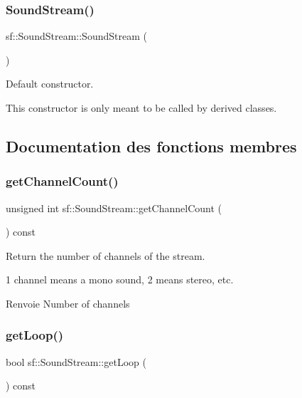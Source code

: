 \subsubsection{\texorpdfstring{Sound\+Stream()}{SoundStream()}}
{\footnotesize\ttfamily sf\+::\+Sound\+Stream\+::\+Sound\+Stream (\begin{DoxyParamCaption}{ }\end{DoxyParamCaption})\hspace{0.3cm}{\ttfamily [protected]}}



Default constructor. 

This constructor is only meant to be called by derived classes. 

\subsection{Documentation des fonctions membres}
\mbox{\label{classsf_1_1SoundStream_a1f70933912dd9498f4dc99feefed27f3}} 
\subsubsection{\texorpdfstring{get\+Channel\+Count()}{getChannelCount()}}
{\footnotesize\ttfamily unsigned int sf\+::\+Sound\+Stream\+::get\+Channel\+Count (\begin{DoxyParamCaption}{ }\end{DoxyParamCaption}) const}



Return the number of channels of the stream. 

1 channel means a mono sound, 2 means stereo, etc.

\begin{DoxyReturn}{Renvoie}
Number of channels 
\end{DoxyReturn}
\mbox{\label{classsf_1_1SoundStream_a49d263f9bbaefec4b019bd05fda59b25}} 
\subsubsection{\texorpdfstring{get\+Loop()}{getLoop()}}
{\footnotesize\ttfamily bool sf\+::\+Sound\+Stream\+::get\+Loop (\begin{DoxyParamCaption}{ }\end{DoxyParamCaption}) const}



